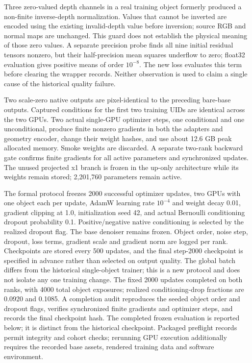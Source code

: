 \documentclass[11pt]{article}
\begin{document}
Three zero-valued depth channels in a real training object formerly produced a non-finite inverse-depth normalization. Values that cannot be inverted are encoded using the existing invalid-depth value before inversion; source RGB and normal maps are unchanged. This guard does not establish the physical meaning of those zero values. A separate precision probe finds all nine initial residual tensors nonzero, but their half-precision mean squares underflow to zero; float32 evaluation gives positive means of order $10^{-8}$. The new loss evaluates this term before clearing the wrapper records. Neither observation is used to claim a single cause of the historical quality failure.

Two scale-zero native outputs are pixel-identical to the preceding bare-base outputs. Captured conditions for the first two training UIDs are identical across the two GPUs. Two actual single-GPU optimizer steps, one conditional and one unconditional, produce finite nonzero gradients in both the adapters and geometry encoder, change their weight hashes, and use about 12.6 GB peak allocated memory. Smoke weights are discarded. A separate two-rank backward gate confirms finite gradients for all active parameters and synchronized updates. The unused projected x1 branch is frozen in the up-only architecture while its weights remain stored; 2,201,760 parameters remain active.

The formal protocol freezes 2000 successful optimizer updates, two GPUs with one object each per update, AdamW learning rate $10^{-4}$ and weight decay 0.01, gradient clipping at 1.0, initialization seed 42, and actual Bernoulli conditioning dropout probability 0.1. Positive/negative native conditioning is selected by the realized dropout flag. The base denoiser remains frozen. Object order, noise step, dropout, loss terms, gradient scale and gradient norm are logged per rank. Checkpoints are stored every 500 updates, and the final step-2000 checkpoint is specified in advance rather than selected on output quality. The global batch differs from the historical single-object trainer; this is a new protocol and does not isolate any one training change. The fixed 2000 updates completed on both ranks, with 4000 total object exposures; realized conditioning-drop fractions are 0.0920 and 0.1085. A completion audit reproduces the seeded object order and dropout flags, verifies synchronized finite gradients and optimizer steps, and records the final checkpoint hash. The completed frozen evaluation is reported below; it is distinct from the historical checkpoint. Packaged preflight records permit integrity and cohort checks; rerunning GPU execution additionally requires the recorded base assets, rendered training data and software environment.
\end{document}
